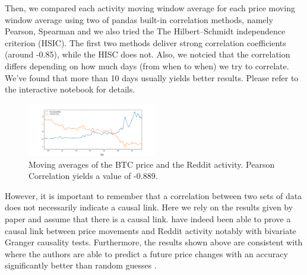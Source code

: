 Then, we compared each activity moving window average for each price moving window average using two of pandas built-in correlation methods, namely Pearson, Spearman and we also tried the The Hilbert–Schmidt independence criterion (HSIC). The first two methods deliver strong correlation coefficients (around -0.85), while the HISC does not. Also, we notcied that the correlation differs depending on how much days (from when to when) we try to correlate. We've found that more than 10 days usually yields better results. Please refer to the interactive notebook for details.

\begin{figure}[H]
    \centering
    \includegraphics[width=0.5\textwidth]{figures/corr_pearson_0.pdf}
    \caption{Moving averages of the BTC price and the Reddit activity. Pearson Correlation yields a value of -0.889.}
\end{figure}


However, it is important to remember that a correlation between two sets of data does not necessarily indicate a causal link. Here we rely on the results given by paper  and assume that there is a causal link. \citeauthor{wooleyExtractingCryptocurrencyPrice2019} have indeed been able to prove a causal link between price movements and Reddit activity notably with bivariate Granger causality tests. Furthermore, the results shown above are consistent with  where the authors are able to predict a future price changes with an accuracy significantly better than random guesses \cite{iderCryptocurrencyReturnPrediction2022}.



